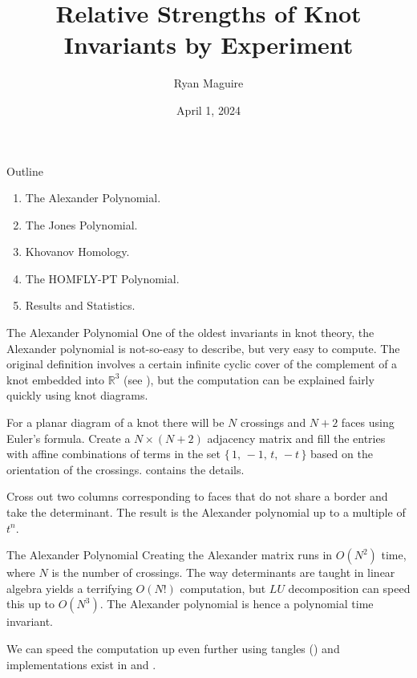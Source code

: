 \documentclass{beamer}
\title{Relative Strengths of Knot Invariants by Experiment}
\author{Ryan Maguire}
\date{April 1, 2024}
\begin{document}
    \maketitle
    \begin{frame}{Outline}
        \begin{enumerate}
            \item The Alexander Polynomial.
            \item The Jones Polynomial.
            \item Khovanov Homology.
            \item The HOMFLY-PT Polynomial.
            \item Results and Statistics.
        \end{enumerate}
    \end{frame}
    \begin{frame}{The Alexander Polynomial}
        One of the oldest invariants in knot theory, the Alexander polynomial
        is not-so-easy to describe, but very easy to compute. The original
        definition involves a certain infinite cyclic cover of the complement
        of a knot embedded into $\mathbb{R}^{3}$
        (see \cite[p.~53]{LickorishKnotTheory}), but the
        computation can be explained fairly quickly using knot diagrams.
        \par\hfill\par
        For a planar diagram of a knot there will be $N$ crossings and
        $N+2$ faces using Euler's formula. Create a $N\times(N+2)$ adjacency
        matrix and fill the entries with affine combinations of terms in the
        set $\{\,1,\,-1,\,t,\,-t\,\}$ based on the orientation of the crossings.
        \cite[p.~49]{LivingstonKnotTheory} contains the details.
        \par\hfill\par
        Cross out two columns corresponding to faces that do not share a
        border and take the determinant. The result is the Alexander polynomial
        up to a multiple of $t^{n}$.
    \end{frame}
    \begin{frame}{The Alexander Polynomial}
        Creating the Alexander matrix runs in $O(N^{2})$ time, where $N$
        is the number of crossings. The way determinants are taught in
        linear algebra yields a terrifying $O(N!)$ computation, but $LU$
        decomposition can speed this up to $O(N^3)$. The Alexander polynomial
        is hence a polynomial time invariant.
        \par\hfill\par
        We can speed the computation up even further using tangles
        (\cite{BarNatanPolynomialTimeKnotPolynomials}) and implementations
        exist in \cite{SnapPy} and \cite{MaguireLibtmpl}.
    \end{frame}
\end{document}
